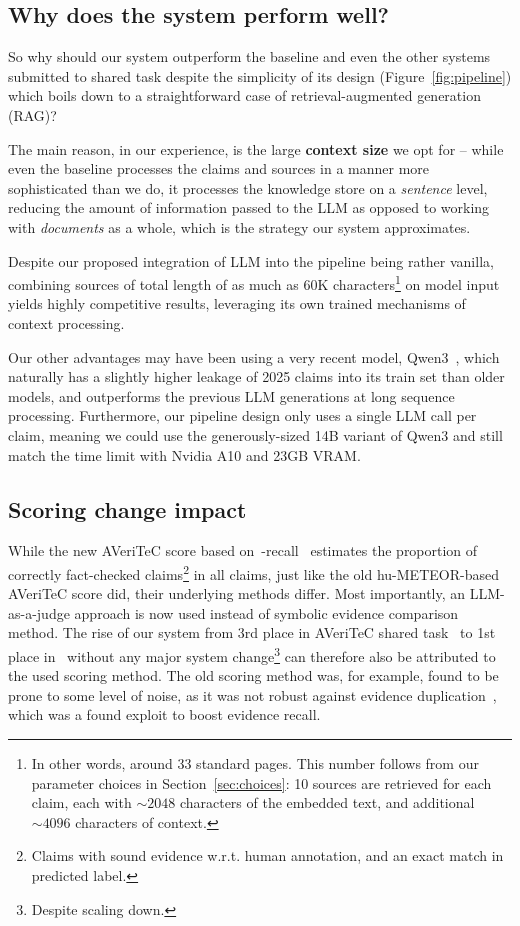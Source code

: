 \subsection{Why does the system perform well?}
\label{sec:why}
So why should our system outperform the \averitec{} baseline and even the other systems submitted to \averitec{} shared task despite the simplicity of its design (Figure~\ref{fig:pipeline}) which boils down to a straightforward case of retrieval-augmented generation (RAG)?

The main reason, in our experience, is the large \textbf{context size} we opt for -- while even the \averitec{} baseline processes the claims and sources in a manner more sophisticated than we do, it processes the knowledge store on a \textit{sentence} level, reducing the amount of information passed to the LLM as opposed to working with \textit{documents} as a whole, which is the strategy our system approximates.

Despite our proposed integration of LLM into the pipeline being rather vanilla, combining sources of total length of as much as 60K characters\footnote{In other words, around 33 standard pages. This number follows from our parameter choices in Section~\ref{sec:choices}: 10 sources are retrieved for each claim, each with $\sim2048$ characters of the embedded text, and additional $\sim4096$ characters of context.} on model input yields highly competitive results, leveraging its own trained mechanisms of context processing.

Our other advantages may have been using a very recent model, Qwen3~\cite{yang2025qwen3technicalreport}, which naturally has a slightly higher leakage of 2025 claims into its train set than older models, and outperforms the previous LLM generations at long sequence processing. Furthermore, our pipeline design only uses a single LLM call per claim, meaning we could use the generously-sized 14B variant of Qwen3 and still match the time limit with Nvidia A10 and 23GB VRAM.

\subsection{Scoring change impact}
\label{sec:score}
While the new AVeriTeC score based on~\evr-recall~\cite{akhtar2024ev2r} estimates the proportion of correctly fact-checked claims\footnote{Claims with sound evidence w.r.t. human annotation, and an exact match in predicted label.} in all claims, just like the old hu-METEOR-based AVeriTeC score did, their underlying methods differ.
Most importantly, an LLM-as-a-judge approach is now used instead of symbolic evidence comparison method.
The rise of our system from 3rd place in AVeriTeC shared task~\cite{schlichtkrull-etal-2024-automated} to 1st place in~\averitec{} without any major system change\footnote{Despite scaling down.} can therefore also be attributed to the used scoring method.
The old scoring method was, for example, found to be prone to some level of noise, as it was not robust against evidence duplication~\cite{malon-2024-multi}, which was a found exploit to boost evidence recall.

